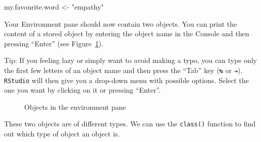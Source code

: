 \documentclass[
  letterpaper,
  DIV=11,
  numbers=noendperiod,
  oneside]{scrreprt}
\newenvironment{Shaded}{\begin{snugshade}}{\end{snugshade}}
\newcommand{\NormalTok}[1]{\textcolor[rgb]{0.00,0.23,0.31}{#1}}
\newcommand{\OtherTok}[1]{\textcolor[rgb]{0.00,0.23,0.31}{#1}}
\newcommand{\StringTok}[1]{\textcolor[rgb]{0.13,0.47,0.30}{#1}}
\begin{document}
\begin{Shaded}
\begin{Highlighting}[]
\NormalTok{my.favourite.word }\OtherTok{\textless{}{-}} \StringTok{"empathy"}
\end{Highlighting}
\end{Shaded}

Your Environment pane should now contain two objects. You can print the
content of a stored object by entering the object name in the Console
and then pressing ``Enter'' (see Figure~\ref{fig-ShowObjects}).

Tip: If you feeling lazy or simply want to avoid making a typo, you can
type only the first few letters of an object name and then press the
``Tab'' key (\texttt{↹} or \texttt{⇥}). \texttt{RStudio} will then give
you a drop-down menu with possible options. Select the one you want by
clicking on it or pressing ``Enter''.

\begin{figure}


\caption{\label{fig-ShowObjects}Objects in the environment pane}

\end{figure}%

These two objects are of different types. We can use the
\texttt{class()} function to find out which type of object an object is.
\end{document}
